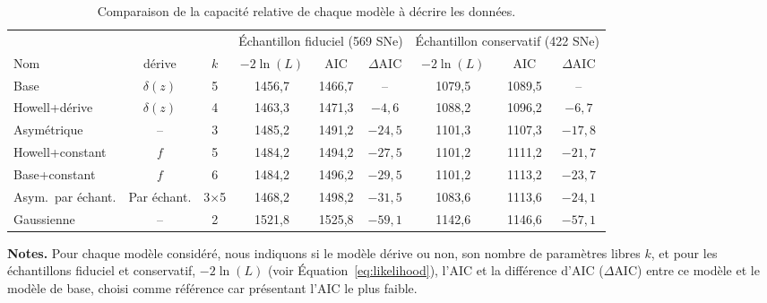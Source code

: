 \documentclass[../main/main.tex]{subfiles}
\begin{document}
\begin{table}[ht]
    \centerfloat
    \begin{threeparttable}
    \caption[Comparaison de la capacité relative de chaque modèle à décrire les
    données par rapport au modèle de base]{Comparaison de la capacité relative
    de chaque modèle à décrire les données.} \label{tab:comp}
        \begin{tabular}{lcccccccc}
            \toprule
            & & & \multicolumn{3}{c}{Échantillon fiduciel (569 SNe)}
                & \multicolumn{3}{c}{Échantillon conservatif (422 SNe)} \\
            \cmidrule(lr){4-6} \cmidrule(lr){7-9}
            Nom & dérive & $k$ &
            $-2\ln(L)$ & AIC & $\Delta$AIC & $-2\ln(L)$ & AIC & $\Delta$AIC\\
            \midrule
            Base & $\delta(z)$ & 5
            & 1456,7 & 1466,7 & -- 
            & 1079,5 & 1089,5 & -- \\
            Howell+dérive & $\delta(z)$ & 4
            & 1463,3 & 1471,3 & $-4,6$
            & 1088,2 & 1096,2 & $-6,7$ 
            \\
            Asymétrique & -- & 3
            & 1485,2 & 1491,2 & $-24,5$
            & 1101,3 & 1107,3 & $-17,8$ 
            \\
            Howell+constant & $f$ & 5
            & 1484,2 & 1494,2 & $-27,5$
            & 1101,2 & 1111,2 & $-21,7$ 
            \\
            Base+constant & $f$ & 6
            & 1484,2 & 1496,2 & $-29,5$
            & 1101,2 & 1113,2 & $-23,7$ 
            \\
            Asym.\ par échant. & Par échant. & 3$\times$5
            & 1468,2 & 1498,2  & $-31,5$
            & 1083,6 & 1113,6  & $-24,1$ 
            \\
            Gaussienne & -- & 2
            & 1521,8 & 1525,8 & $-59,1$
            & 1142,6 & 1146,6 & $-57,1$ 
            \\
            \bottomrule
        \end{tabular}%
        \begin{tablenotes}[flushleft]
        \item\small \textbf{\hspace{-3.2pt}Notes.} Pour chaque modèle considéré,
            nous indiquons si le modèle dérive ou non, son nombre de paramètres
            libres $k$, et pour les échantillons fiduciel et conservatif,
            $-2\ln(L)$ (voir Équation~\ref{eq:likelihood}), l'AIC et la
            différence d'AIC ($\Delta$AIC) entre ce modèle et le modèle de base,
            choisi comme référence car présentant l'AIC le plus faible.
        \end{tablenotes}
    \end{threeparttable}
\end{table}
\end{document}
